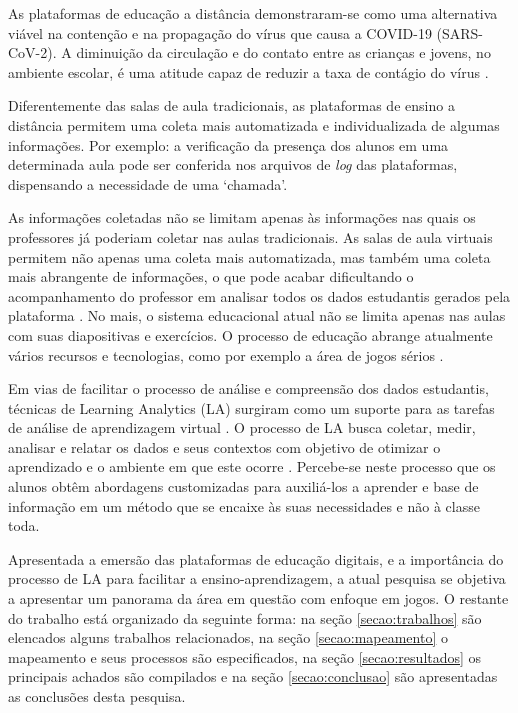 \documentclass[12pt]{article}
\begin{document}
As plataformas de educação a distância demonstraram-se como uma alternativa viável na contenção e na propagação do vírus que causa a COVID-19 (SARS-CoV-2). A diminuição da circulação e do contato entre as crianças e jovens, no ambiente escolar, é uma atitude capaz de reduzir a taxa de contágio do vírus \cite{ferguson2020report}. 

Diferentemente das salas de aula tradicionais, as plataformas de ensino a distância permitem uma coleta mais automatizada e individualizada de algumas informações. Por exemplo: a verificação da presença dos alunos em uma determinada aula pode ser conferida nos arquivos de \textit{log} das plataformas, dispensando a necessidade de uma `chamada'.

As informações coletadas não se limitam apenas às informações nas quais os professores já poderiam coletar nas aulas tradicionais. As salas de aula virtuais permitem não apenas uma coleta mais automatizada, mas também uma coleta mais abrangente de informações, o que pode acabar dificultando o acompanhamento do professor em analisar todos os dados estudantis gerados pela plataforma \cite{de2019tendencias}. No mais, o sistema educacional atual não se limita apenas nas aulas com suas diapositivas e exercícios. O processo de educação abrange atualmente vários recursos e tecnologias, como por exemplo a área de jogos sérios \cite{educaccao2020ensino}.


Em vias de facilitar o processo de análise e compreensão dos dados estudantis, técnicas de Learning Analytics (LA) surgiram como um suporte para as tarefas de análise de aprendizagem virtual \cite{ruiperez2015alas}. O processo de LA busca coletar, medir, analisar e relatar os dados e seus contextos com objetivo de otimizar o aprendizado e o ambiente em que este ocorre \cite{moissa2015educational}. Percebe-se neste processo que os alunos obtêm abordagens customizadas para auxiliá-los a aprender e base de informação em um método que se encaixe às suas necessidades e não à classe toda.

\vspace{-0.1cm}

Apresentada a emersão das plataformas de educação digitais, e a importância do processo de LA para facilitar a ensino-aprendizagem, a atual pesquisa se objetiva a apresentar um panorama da área em questão com enfoque em jogos. O restante do trabalho está organizado da seguinte forma: na seção \ref{secao:trabalhos} são elencados alguns trabalhos relacionados, na seção \ref{secao:mapeamento} o mapeamento e seus processos são especificados, na seção \ref{secao:resultados} os principais achados são compilados e na seção \ref{secao:conclusao} são apresentadas as conclusões desta pesquisa. 
\end{document}
